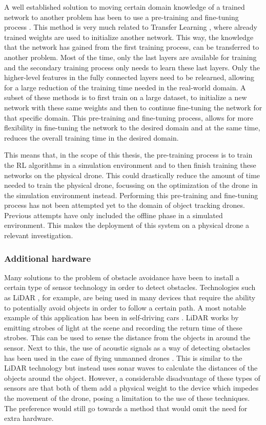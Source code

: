 A well established solution to moving certain domain knowledge of a trained 
network to another problem has been to use a pre-training and fine-tuning process \cite{pretrainingfinetuning}.
This method is very much related to Transfer Learning \cite{DroneRLUsingTransferLearning},
where already trained weights are used to initialize another network. This way, the knowledge 
that the network has gained from the first training process, can be transferred to another 
problem. Most of the time, only the last layers are available for training and the 
secondary training process only needs to learn these last layers. Only the higher-level 
features in the fully connected layers need to be relearned, allowing 
for a large reduction of the training time needed in the real-world domain. A subset of these
methods is to first train on a large dataset, to initialize a new network 
with these same weights and then to continue fine-tuning the network for that specific 
domain. This pre-training and fine-tuning process, allows for more flexibility in  
fine-tuning the network to the desired domain and at the same time, reduces the 
overall training time in the desired domain. 

This means that, in the scope of this thesis,
the pre-training process is to train the RL algorithms in a simulation environment and to 
then finish training these networks on the physical drone. This could drastically 
reduce the amount of time needed to train the physical drone, focussing on the optimization
of the drone in the simulation environment instead. Performing this pre-training 
and fine-tuning process has not been attempted yet to the domain of object tracking 
drones. Previous attempts have only included the offline phase in a simulated environment.
This makes the deployment of this system on a physical drone a relevant 
investigation. 

\subsubsection{Additional hardware}
Many solutions to the problem of obstacle avoidance have been to install a 
certain type of sensor technology in order to detect obstacles. Technologies such as 
LiDAR \cite{ObstacleAvoidance}, for example, are being used in many devices that require 
the ability to potentially avoid objects in order to follow a certain path. A most notable
example of this application has been in self-driving cars \cite{lidarinselfdrivingcar}. LiDAR 
works by emitting strobes of light at the scene and recording the return time of these 
strobes. This can be used to sense the distance from the objects in around the sensor. 
Next to this, the use of acoustic signals as a way of detecting obstacles has been used 
in the case of flying unmanned drones \cite{acousticdronefollower}. This is similar to the 
LiDAR technology but instead uses sonar waves to calculate the distances of the objects 
around the object. However, a considerable disadvantage of these types of sensors are that 
both of them add a physical weight to the device which impedes the movement of 
the drone, posing a limitation to the use of these techniques. The preference would still 
go towards a method that would omit the need for extra hardware. 


